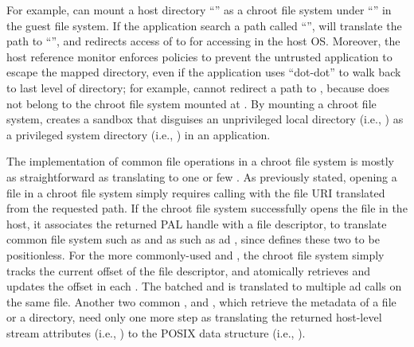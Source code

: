  



For example, \thelibos{} can mount a host directory ``'' as a chroot file system under ``'' in the guest file system.
If the application search a path called ``'', \thelibos{} will translate the path to ``'', and redirects access of  to \hostapis{} for accessing  in the host OS.
Moreover, the host reference monitor enforces policies
to prevent the untrusted application
to escape the mapped directory, even if the application uses ``dot-dot'' to walk back to last level of directory; for example, \thelibos{} cannot redirect a path  to , because  does not belong to the chroot file system mounted at .
By mounting a chroot file system, \thelibos{} creates a sandbox that disguises an unprivileged local directory (i.e., )
as a privileged system directory (i.e., ) in an application.
  

The implementation of common file operations in a chroot file system is mostly as straightforward as translating to one or few \hostapis{}.
As previously stated, opening a file in a chroot file system
simply requires calling  with the file URI translated from the requested path.
If the chroot file system successfully opens the file in the host,
it associates the returned PAL handle with a file descriptor, to translate common file system \linuxapis{} such as  and 
as \hostapis{} such as  ad , since \thehostabi{} defines these two \hostapis{} to be positionless.
For the more commonly-used  and ,
the chroot file system
simply tracks the current offset of the file descriptor, and atomically retrieves and updates the offset in each \linuxapi{}.
The batched  and 
is translated to multiple  ad  calls
on the same file.
Another two common \linuxapis{},
 and , which retrieve the metadata of a file or a directory,
need only one more step as
translating the returned host-level stream attributes
(i.e., )
to the POSIX data structure (i.e., ).


